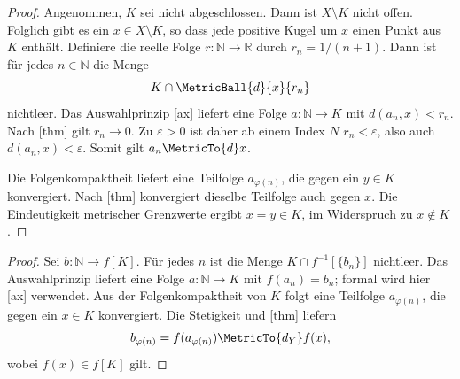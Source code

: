 \documentclass[main.tex]{subfiles}
\begin{document}
\begin{proof}
Angenommen, \(K\) sei nicht abgeschlossen. Dann ist \(X\setminus K\) nicht
offen. Folglich gibt es ein \(x\in X\setminus K\), so dass jede positive
Kugel um \(x\) einen Punkt aus \(K\) enthält. Definiere die reelle Folge
\(r\colon\mathbb N\to\mathbb R\) durch \(r_n=1/(n+1)\). Dann ist für jedes
\(n\in\mathbb N\) die Menge
\[
 K\cap\MetricBall{d}{x}{r_n}
\]
nichtleer. Das Auswahlprinzip
[ax] liefert eine Folge
\(a\colon\mathbb N\to K\) mit
\(d(a_n,x)<r_n\). Nach
[thm] gilt
\(r_n\to0\). Zu \(\varepsilon>0\) ist daher ab einem Index \(N\)
\(r_n<\varepsilon\), also auch \(d(a_n,x)<\varepsilon\). Somit gilt
\(a_n\MetricTo{d}x\).

Die Folgenkompaktheit liefert eine Teilfolge \(a_{\varphi(n)}\), die gegen
ein \(y\in K\) konvergiert. Nach
[thm] konvergiert dieselbe
Teilfolge auch gegen \(x\). Die Eindeutigkeit metrischer Grenzwerte ergibt
\(x=y\in K\), im Widerspruch zu \(x\notin K\).
\end{proof}

\begin{proof}
Sei \(b\colon\mathbb N\to f[K]\). Für jedes \(n\) ist die Menge
\(K\cap f^{-1}[\{b_n\}]\) nichtleer. Das Auswahlprinzip liefert eine Folge
\(a\colon\mathbb N\to K\) mit \(f(a_n)=b_n\); formal wird hier
[ax] verwendet. Aus der Folgenkompaktheit von
\(K\) folgt eine Teilfolge \(a_{\varphi(n)}\), die gegen ein \(x\in K\)
konvergiert. Die Stetigkeit und
[thm] liefern
\[
 b_{\varphi(n)}=f(a_{\varphi(n)})\MetricTo{d_Y}f(x),
\]
wobei \(f(x)\in f[K]\) gilt.
\end{proof}
\end{document}

